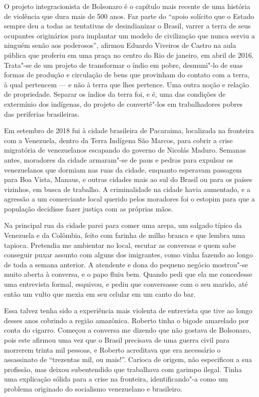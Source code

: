 O projeto integracionista de Bolsonaro é o capítulo mais recente de uma
história de violência que dura mais de 500 anos. Faz parte do ``apoio
solícito que o Estado sempre deu a todas as tentativas de desindianizar
o Brasil, varrer a terra de seus ocupantes originários para implantar um
modelo de civilização que nunca serviu a ninguém senão aos poderosos'',
afirmou Eduardo Viveiros de Castro na aula pública que proferiu em uma
praça no centro do Rio de janeiro, em abril de 2016. Trata"-se de um
projeto de transformar o índio em pobre, desmuni"-lo de suas formas de
produção e circulação de bens que provinham do contato com a terra, à
qual pertencem --- e não à terra que lhes pertence. Uma outra noção e
relação de propriedade. Separar os índios da terra foi, e é, uma das
condições de extermínio dos indígenas, do projeto de convertê"-los em
trabalhadores pobres das periferias brasileiras.

\asterisc

Em setembro de 2018 fui à cidade brasileira de Pacaraima, localizada na
fronteira com a Venezuela, dentro da Terra Indígena São Marcos, para
cobrir a crise migratória de venezuelanos escapando do governo de
Nicolás Maduro. Semanas antes, moradores da cidade armaram"-se de paus e
pedras para expulsar os venezuelanos que dormiam nas ruas da cidade,
enquanto esperavam passagem para Boa Vista, Manaus, e outras cidades
mais ao sul do Brasil ou para os países vizinhos, em busca de trabalho.
A criminalidade na cidade havia aumentado, e a agressão a um comerciante
local querido pelos moradores foi o estopim para que a população
decidisse fazer justiça com as próprias mãos.

Na principal rua da cidade parei para comer uma arepa, um salgado típico
da Venezuela e da Colômbia, feito com farinha de milho branca e que
lembra uma tapioca. Pretendia me ambientar no local, escutar as
conversas e quem sabe conseguir puxar assunto com alguns dos imigrantes,
como vinha fazendo ao longo de toda a semana anterior. A atendente e
dona do pequeno negócio mostrou"-se muito aberta à conversa, e o papo
fluiu bem. Quando pedi que ela me concedesse uma entrevista formal,
esquivou, e pediu que conversasse com o seu marido, até então um vulto
que mexia em seu celular em um canto do bar.

Essa talvez tenha sido a experiência mais violenta de entrevista que
tive ao longo desses anos cobrindo a região amazônica. Roberto
tinha o bigode amarelado por conta do cigarro. Começou a conversa me
dizendo que não gostava de Bolsonaro, pois este afirmou uma vez que o
Brasil precisava de uma guerra civil para morrerem trinta mil pessoas, e
Roberto acreditava que era necessário o assassinato de ``trezentas mil,
ou mais!''. Carioca de origem, não especificou a sua profissão, mas
deixou subentendido que trabalhava com garimpo ilegal. Tinha uma
explicação sólida para a crise na fronteira, identificando"-a como um
problema originado do socialismo venezuelano e brasileiro.

